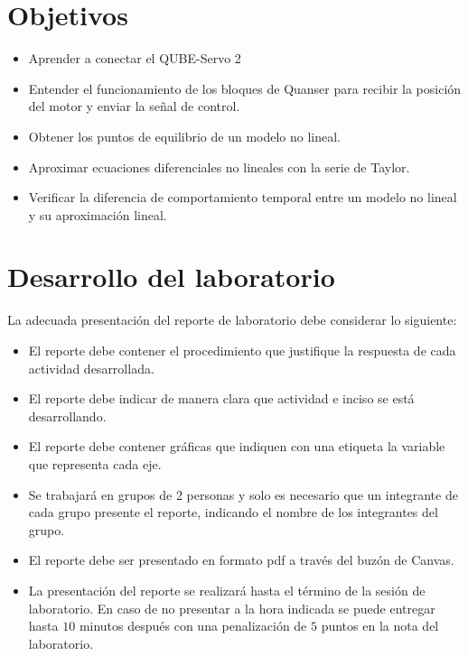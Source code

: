 	\section{Objetivos}
	\begin{itemize}
		\item Aprender a conectar el QUBE-Servo 2
		\item Entender el funcionamiento de los bloques de Quanser para recibir la posición del motor y enviar la señal de control.
		\item Obtener los puntos de equilibrio de un modelo no lineal.
		\item Aproximar ecuaciones diferenciales no lineales con la serie de Taylor.
		\item Verificar la diferencia de comportamiento temporal entre un modelo no lineal y su aproximación lineal.
	\end{itemize}
	
	\section{Desarrollo del laboratorio}
	La adecuada presentación del reporte  de laboratorio debe considerar lo siguiente:
	
	\begin{itemize}
		\item El reporte debe contener el procedimiento que justifique la respuesta de cada actividad desarrollada.
		
		\item El reporte debe indicar de manera clara que actividad e inciso se está desarrollando.
		
		\item El reporte debe contener gráficas que indiquen con una etiqueta la variable que representa cada eje.
		
		\item Se trabajará en grupos de 2 personas y solo es necesario que un
		integrante de cada grupo presente el reporte, indicando el nombre de los
		integrantes del grupo.
		
		\item El reporte debe ser presentado en formato pdf a través del buzón de Canvas.
		
		\item La presentación del reporte se realizará hasta el término de la sesión de
		laboratorio. En caso de no presentar a la hora indicada se puede entregar hasta $10$ minutos después con una penalización de $5$ puntos en la nota del laboratorio. 
	\end{itemize}
	
